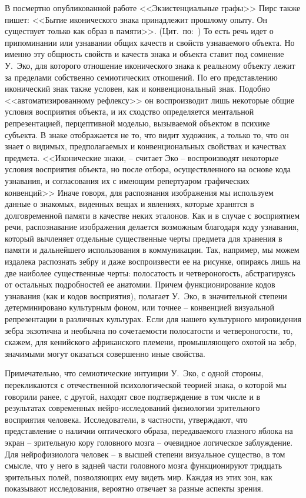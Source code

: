 В посмертно опубликованной работе
<<Экзистенциальные графы>> Пирс также пишет: <<Бытие иконического знака принадлежит
прошлому опыту. Он существует только как образ в памяти>>.
(Цит.~по:~\autocite{jakobson1983}) То есть речь идет о припоминании или
узнавании общих качеств и свойств узнаваемого объекта. Но именно эту общность
свойств и качеств знака и объекта ставит под сомнение У.~Эко, для которого
отношение иконического знака к реальному объекту лежит за пределами собственно
семиотических отношений. По его представлению иконический знак также условен,
как и конвенциональный знак. Подобно <<автоматизированному рефлексу>>  он
воспроизводит лишь некоторые общие условия восприятия объекта, и их сходство
определяется ментальной репрезентацией, перцептивной моделью, вызываемой
объектом в психике субъекта. В знаке отображается не то, что видит художник,
а только то, что он знает о видимых, предполагаемых и конвенциональных свойствах
и качествах предмета. <<Иконические знаки, -- считает Эко -- воспроизводят
некоторые условия восприятия объекта, но после отбора, осуществленного на
основе кода узнавания, и согласования их с имеющим репертуаром графических
конвенций>>\autocite[][160]{eko1998} Иначе говоря, для распознания
изображения мы используем данные о знакомых, виденных вещах и явлениях, которые
хранятся в долговременной памяти в качестве неких эталонов.  Как и в случае с
восприятием речи, распознавание изображения делается возможным благодаря коду
узнавания, который вычленяет отдельные существенные черты предмета для хранения
в памяти и дальнейшего использования в коммуникации. Так, например, мы можем
издалека распознать зебру и даже воспроизвести ее на рисунке, опираясь лишь на
две наиболее существенные черты: полосатость и четвероногость, абстрагируясь от
остальных подробностей ее анатомии. Причем функционирование кодов узнавания
(как и кодов восприятия), полагает У.~Эко, в значительной степени детерминировано
культурным фоном, или точнее -- конвенцией визуальной репрезентации в различных
культурах. Если для нашего культурного мировидения  зебра экзотична и необычна
по сочетаемости полосатости и четвероногости, то, скажем, для кенийского
африканского племени, промышляющего охотой на зебр, значимыми могут оказаться
совершенно иные свойства.\autocite[][160]{eko1998}

Примечательно, что семиотические интуиции У.~Эко, с одной стороны, перекликаются
с отечественной психологической теорией знака, о которой мы говорили ранее,
с другой,  находят свое подтверждение в том числе и в результатах современных
нейро-исследований физиологии зрительного восприятия человека. Исследователи,
в частности, утверждают, что представление о наличии оптического образа,
передаваемого глазного яблока на экран -- зрительную кору головного мозга --
очевидное логическое заблуждение. Для нейрофизиолога человек -- в высшей степени
визуальное существо, в том смысле, что у него в задней части головного
мозга функционируют тридцать зрительных полей, позволяющих ему видеть мир.
Каждая из этих зон, как показывают исследования, вероятно отвечает за разные
аспекты зрения.\autocite{velyanur2006}

